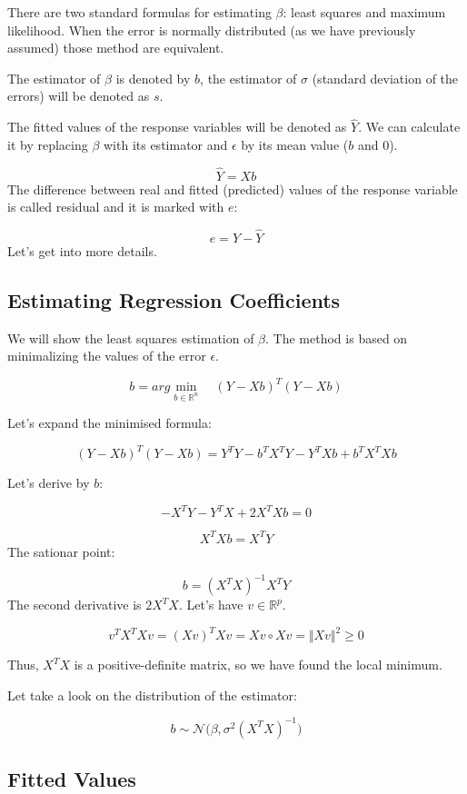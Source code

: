 \documentclass[
]{article}
\begin{document}
There are two standard formulas for estimating \(\beta\): least squares
and maximum likelihood. When the error is normally distributed (as we
have previously assumed) those method are equivalent.

The estimator of \(\beta\) is denoted by \(b\), the estimator of
\(\sigma\) (standard deviation of the errors) will be denoted as \(s\).

The fitted values of the response variables will be denoted as
\(\hat{Y}\). We can calculate it by replacing \(\beta\) with its
estimator and \(\epsilon\) by its mean value (\(b\) and \(0\)).

\[\hat Y = Xb\] The difference between real and fitted (predicted)
values of the response variable is called residual and it is marked with
\(e\):

\[e = Y - \hat Y\] Let's get into more details.

\hypertarget{estimating-regression-coefficients}{%
\subsection{Estimating Regression
Coefficients}\label{estimating-regression-coefficients}}

We will show the least squares estimation of \(\beta\). The method is
based on minimalizing the values of the error \(\epsilon\).

\[b = arg\min_{b \in \mathbb R ^n}  \quad (Y - Xb)^T(Y - Xb)\]

Let's expand the minimised formula:

\[(Y - Xb)^T(Y - Xb) = Y^TY - b^TX^TY - Y^TXb + b^TX^TXb\]

Let's derive by \(b\):

\[-X^TY - Y^TX + 2X^TXb = 0\]

\[X^TXb = X^TY\] The sationar point:

\[b = (X^TX)^{-1}X^TY\] The second derivative is \(2X^TX\). Let's have
\(v \in \mathbb R ^p\).

\[v^T X^TXv = (Xv)^TXv = Xv \circ Xv = \Vert Xv \Vert^2 \geq 0\]

Thus, \(X^TX\) is a positive-definite matrix, so we have found the local
minimum.

Let take a look on the distribution of the estimator:

\[b \sim \mathcal N\big(\beta, \sigma^2(X^TX)^{-1}\big)\]

\hypertarget{fitted-values}{%
\subsection{Fitted Values}\label{fitted-values}}
\end{document}
